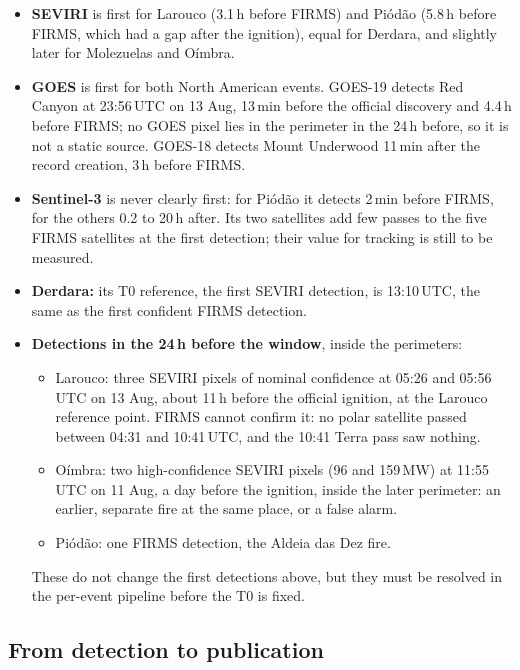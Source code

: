 \documentclass[11pt]{article}
\begin{document}
\begin{itemize}[leftmargin=1.2cm]
    \item \textbf{SEVIRI} is first for Larouco (3.1\,h before FIRMS) and Pi\'od\~ao (5.8\,h before FIRMS, which had a gap after the ignition), equal for Derdara, and slightly later for Molezuelas and O\'imbra.
    \item \textbf{GOES} is first for both North American events. GOES-19 detects Red Canyon at 23:56\,UTC on 13 Aug, 13\,min before the official discovery and 4.4\,h before FIRMS; no GOES pixel lies in the perimeter in the 24\,h before, so it is not a static source. GOES-18 detects Mount Underwood 11\,min after the record creation, 3\,h before FIRMS.
    \item \textbf{Sentinel-3} is never clearly first: for Pi\'od\~ao it detects 2\,min before FIRMS, for the others 0.2 to 20\,h after. Its two satellites add few passes to the five FIRMS satellites at the first detection; their value for tracking is still to be measured.
    \item \textbf{Derdara:} its T0 reference, the first SEVIRI detection, is 13:10\,UTC, the same as the first confident FIRMS detection.
    \item \textbf{Detections in the 24\,h before the window}, inside the perimeters:
    \begin{itemize}
        \item Larouco: three SEVIRI pixels of nominal confidence at 05:26 and 05:56\,UTC on 13 Aug, about 11\,h before the official ignition, at the Larouco reference point. FIRMS cannot confirm it: no polar satellite passed between 04:31 and 10:41\,UTC, and the 10:41 Terra pass saw nothing.
        \item O\'imbra: two high-confidence SEVIRI pixels (96 and 159\,MW) at 11:55\,UTC on 11 Aug, a day before the ignition, inside the later perimeter: an earlier, separate fire at the same place, or a false alarm.
        \item Pi\'od\~ao: one FIRMS detection, the Aldeia das Dez fire.
    \end{itemize}
    These do not change the first detections above, but they must be resolved in the per-event pipeline before the T0 is fixed.
\end{itemize}

\subsection{From detection to publication}\label{subsec:latency}
\end{document}
